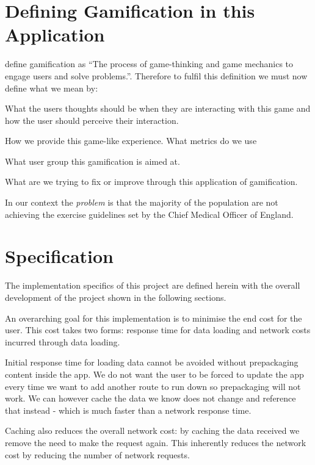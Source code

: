 \section{Defining Gamification in this Application}

\citet{gamification_book} define gamification as ``The process of
game-thinking and game mechanics to engage users and solve
problems.''. Therefore to fulfil this definition we must now define
what we mean by:  

\begin{description}[style=multiline, leftmargin=3cm]
\item[\emph{game-thinking}] What the users thoughts should be when
  they are interacting with this game and how the user should perceive
  their interaction.
\item[\emph{game mechanics}] How we provide this game-like
  experience. What metrics do we use 
\item[\emph{users}] What user group this gamification is aimed at.
\item[\emph{problems}] What are we trying to fix or improve through
  this application of gamification.
\end{description}

In our context the \emph{problem} is that the majority of the
population are not achieving the exercise guidelines set by the Chief
Medical Officer of England\cite{exercise}. 

\section{Specification}
\label{sec:specification}
The implementation specifics of this project are defined herein with
the overall development of the project shown in the following sections.

An overarching goal for this implementation is to minimise the end cost
for the user. This cost takes two forms: response time for data
loading and network costs incurred through data loading.

Initial response time for loading data cannot be avoided without
prepackaging content inside the app. We do not want the user to be
forced to update the app every time we want to add another route to
run down so prepackaging will not work. We can however cache the data
we know does not change and reference that instead - which is much
faster than a network response time.

Caching also reduces the overall network cost: by caching the data
received we remove the need to make the request again. This inherently
reduces the network cost by reducing the number of network requests.

